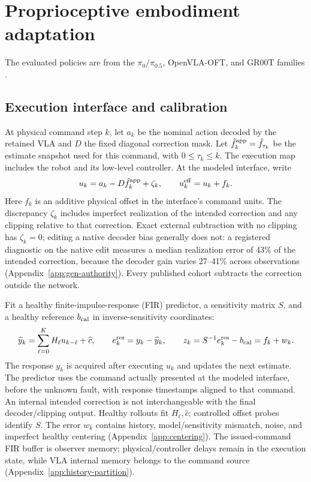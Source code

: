 \section{Proprioceptive embodiment adaptation}
\label{sec:vla-method}
The evaluated policies are from the $\pi_0/\pi_{0.5}$, OpenVLA-OFT, and
GR00T families \citep{pi0,pi05,openvlaoft,grootn1,grootn17}.
\subsection{Execution interface and calibration}
At physical command step $k$, let $a_k$ be the nominal action decoded by the
retained VLA and $D$ the fixed diagonal correction mask. Let
$\hat f_k^{\rm app}=\hat f_{\tau_k}$ be the estimate snapshot used for this
command, with $0\le\tau_k\le k$. The execution map includes the robot
and its low-level controller. At the modeled interface, write
\begin{equation}
u_k=a_k-D\hat f_k^{\rm app}+\zeta_k,\qquad
u_k^{\rm eff}=u_k+f_k.
\label{eq:vla-command}
\end{equation}
Here $f_k$ is an additive physical offset in the interface's command units.
The discrepancy $\zeta_k$ includes imperfect realization of the intended
correction and any clipping relative to that correction. Exact external
subtraction with no clipping has $\zeta_k=0$; editing a native decoder bias
generally does not: a registered diagnostic on the native
 edit measures a median realization error of
43\% of the intended correction, because the decoder gain varies 27--41\%
across observations (Appendix~\ref{app:gen-authority}). Every published
cohort subtracts the correction outside the network.

Fit a healthy finite-impulse-response (FIR) predictor, a sensitivity matrix
$S$, and a healthy reference $b_{\rm cal}$ in inverse-sensitivity coordinates:
\begin{equation}
\widehat y_k=\sum_{\ell=0}^{K}H_\ell u_{k-\ell}+\widehat c,
\qquad e_k^{\rm res}=y_k-\widehat y_k,\qquad
z_k=S^{-1}e_k^{\rm res}-b_{\rm cal}=f_k+w_k.
\label{eq:vla-observation}
\end{equation}
The response $y_k$ is acquired after executing $u_k$ and updates the next
estimate. The predictor uses the command actually presented at the modeled
interface, before the unknown fault, with response timestamps aligned to that
command. An internal intended correction is not interchangeable with the
final decoder/clipping output. Healthy rollouts fit $H_\ell,\widehat c$;
controlled offset probes identify $S$. The error $w_k$ contains history,
model/sensitivity mismatch, noise, and imperfect healthy centering
(Appendix~\ref{app:centering}). The issued-command FIR buffer is observer
memory; physical/controller delays remain in the execution state, while VLA
internal memory belongs to the command source (Appendix~\ref{app:history-partition}).




